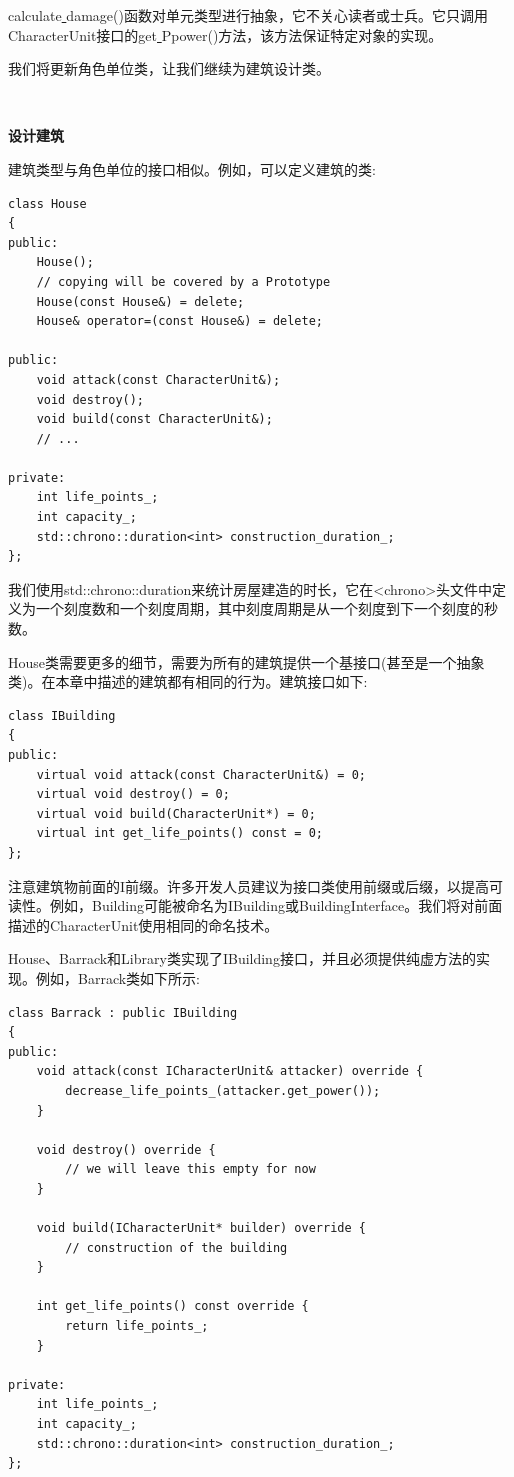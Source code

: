 calculate\underline{ }damage()函数对单元类型进行抽象，它不关心读者或士兵。它只调用CharacterUnit接口的get\underline{ }Ppower()方法，该方法保证特定对象的实现。\par
我们将更新角色单位类，让我们继续为建筑设计类。 \par

\noindent\textbf{}\ \par
\textbf{设计建筑} \ \par
建筑类型与角色单位的接口相似。例如，可以定义建筑的类: \par

\begin{lstlisting}[caption={}]
class House
{
public:
	House();
	// copying will be covered by a Prototype
	House(const House&) = delete;
	House& operator=(const House&) = delete;
	
public:
	void attack(const CharacterUnit&);
	void destroy();
	void build(const CharacterUnit&);
	// ...
	
private:
	int life_points_;
	int capacity_;
	std::chrono::duration<int> construction_duration_;
};
\end{lstlisting}

我们使用std::chrono::duration来统计房屋建造的时长，它在<chrono>头文件中定义为一个刻度数和一个刻度周期，其中刻度周期是从一个刻度到下一个刻度的秒数。 \par
House类需要更多的细节，需要为所有的建筑提供一个基接口(甚至是一个抽象类)。在本章中描述的建筑都有相同的行为。建筑接口如下: \par

\begin{lstlisting}[caption={}]
class IBuilding
{
public:
	virtual void attack(const CharacterUnit&) = 0;
	virtual void destroy() = 0;
	virtual void build(CharacterUnit*) = 0;
	virtual int get_life_points() const = 0;
};
\end{lstlisting}

注意建筑物前面的I前缀。许多开发人员建议为接口类使用前缀或后缀，以提高可读性。例如，Building可能被命名为IBuilding或BuildingInterface。我们将对前面描述的CharacterUnit使用相同的命名技术。 \par
House、Barrack和Library类实现了IBuilding接口，并且必须提供纯虚方法的实现。例如，Barrack类如下所示: \par

\begin{lstlisting}[caption={}]
class Barrack : public IBuilding
{
public:
	void attack(const ICharacterUnit& attacker) override {
		decrease_life_points_(attacker.get_power());
	}

	void destroy() override {
		// we will leave this empty for now
	}

	void build(ICharacterUnit* builder) override {
		// construction of the building
	}

	int get_life_points() const override {
		return life_points_;
	}

private:
	int life_points_;
	int capacity_;
	std::chrono::duration<int> construction_duration_;
};
\end{lstlisting}

